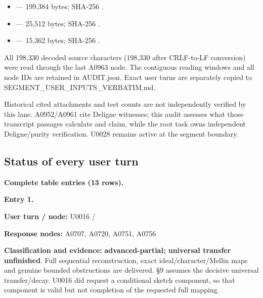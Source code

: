 \begin{itemize}
\tightlist
\item
  \protect{}
  --- 199,384 bytes; SHA-256
  \protect{}.
\item
  \protect{}
  --- 25,512 bytes; SHA-256
  \protect{}.
\item
  \protect{} ---
  15,362 bytes; SHA-256
  \protect{}.
\end{itemize}

All 198,330 decoded source characters (198,330 after CRLF-to-LF
conversion) were read through the last A0963 node. The contiguous
reading windows and all node IDs are retained in AUDIT.json. Exact user
turns are separately copied to SEGMENT\_USER\_INPUTS\_VERBATIM.md.

Historical cited attachments and test counts are not independently
verified by this lane. A0952/A0961 cite Deligne witnesses; this audit
assesses what those transcript passages calculate and claim, while the
root task owns independent Deligne/purity verification. U0028 remains
active at the segment boundary.

\subsection{Status of every user turn}\label{TranscriptLedgerStage:status-of-every-user-turn}

\textbf{Complete table entries (13 rows).}


\textbf{Entry 1.}

\textbf{User turn / node:} U0016 /
\protect{}

\textbf{Response nodes:} A0707, A0720, A0751, A0756

\textbf{Classification and evidence:} \textbf{advanced-partial;
universal transfer unfinished}. Full sequential reconstruction, exact
ideal/character/Mellin maps and genuine bounded obstructions are
delivered. §9 assumes the decisive universal transfer/decay. U0016 did
request a conditional sketch component, so that component is valid but
not completion of the requested full mapping.

